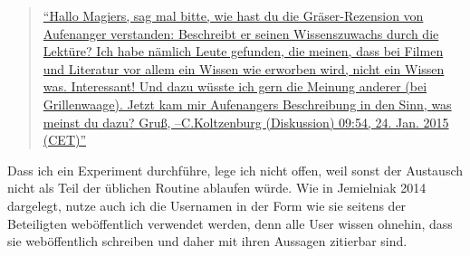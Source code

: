 \documentclass[fontsize=12pt]{scrartcl}
\begin{document}
\singlespacing
\begin{quote}
\href{https://de.wikipedia.org/w/index.php?title=Benutzer_Diskussion:Magiers&diff=prev&oldid=138104304}{"`Hallo Magiers, sag mal bitte, wie hast du die Gr\"aser-Rezension von Aufenanger verstanden: Beschreibt er seinen Wissenszuwachs durch die Lekt\"ure? Ich habe n\"amlich Leute gefunden, die meinen, dass bei Filmen und Li\-te\-ra\-tur vor allem ein \flq Wissen wie\frq\,\,erworben wird, nicht ein \flq Wissen was\frq. Interessant! Und dazu w\"usste ich gern die Meinung an\-de\-rer (bei Grillenwaage). Jetzt kam mir Aufenangers Beschreibung in den Sinn, was meinst du dazu? Gru{\ss}, --C.Kolt\-zen\-burg (Dis\-kus\-si\-on) 09:54, 24. Jan. 2015 (CET)"'} 
\end{quote}
\onehalfspacing

Dass ich ein Experiment durchf\"uhre, lege ich nicht offen, weil sonst der Austausch nicht als Teil der \"ublichen Routine ablaufen w\"urde. Wie in Jemielniak 2014 dargelegt, nutze auch ich die Usernamen in der Form wie sie seitens der Beteiligten web\"of\-fent\-lich verwendet werden, denn alle \mbox{User} wissen ohnehin, dass sie web\"of\-fent\-lich schrei\-ben und daher mit ihren Aussagen zitierbar sind.
\end{document}
